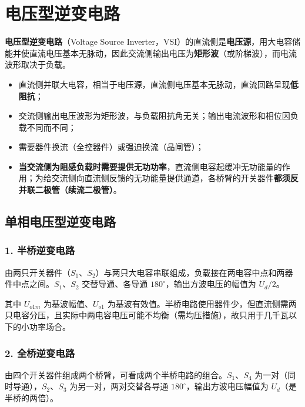 \section{电压型逆变电路}

\textbf{电压型逆变电路}（Voltage Source Inverter，VSI）的直流侧是\textbf{电压源}，用大电容储能并使直流电压基本无脉动，因此交流侧输出电压为\textbf{矩形波}（或阶梯波），而电流波形取决于负载。

\begin{itemize}
  \item 直流侧并联大电容，相当于电压源，直流侧电压基本无脉动，直流回路呈现\textbf{低阻抗}；
  \item 交流侧输出电压波形为矩形波，与负载阻抗角无关；输出电流波形和相位因负载不同而不同；
  \item 需要器件换流（全控器件）或强迫换流（晶闸管）；
  \item \textbf{当交流侧为阻感负载时需要提供无功功率}，直流侧电容起缓冲无功能量的作用；为给交流侧向直流侧反馈的无功能量提供通道，各桥臂的开关器件\textbf{都须反并联二极管（续流二极管）}。
\end{itemize}

\subsection{单相电压型逆变电路}

\subsubsection*{1. 半桥逆变电路}

由两只开关器件（$S_1$、$S_2$）与两只大电容串联组成，负载接在两电容中点和两器件中点之间。$S_1$、$S_2$ 交替导通、各导通 $180^\circ$，输出方波电压的幅值为 $U_d/2$。


其中 $U_{o1m}$ 为基波幅值、$U_{o1}$ 为基波有效值。半桥电路使用器件少，但直流侧需两只电容分压，且实际中两电容电压可能不均衡（需均压措施），故只用于几千瓦以下的小功率场合。

\subsubsection*{2. 全桥逆变电路}

由四个开关器件组成两个桥臂，可看成两个半桥电路的组合。$S_1$、$S_4$ 为一对（同时导通），$S_2$、$S_3$ 为另一对，两对交替各导通 $180^\circ$，输出方波电压幅值为 $U_d$（是半桥的两倍）。

